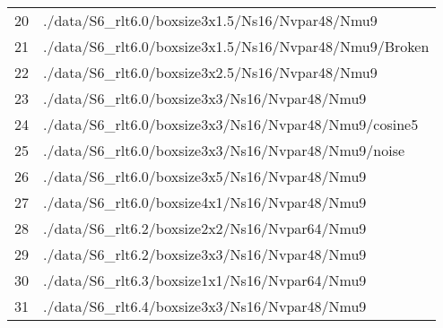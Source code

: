 \begin{center}
\begin{tabular}{l | l }
        20  & ./data/S6\_rlt6.0/boxsize3x1.5/Ns16/Nvpar48/Nmu9                  \\ 
        21  & ./data/S6\_rlt6.0/boxsize3x1.5/Ns16/Nvpar48/Nmu9/Broken           \\ 
        22  & ./data/S6\_rlt6.0/boxsize3x2.5/Ns16/Nvpar48/Nmu9                  \\ 
        23  & ./data/S6\_rlt6.0/boxsize3x3/Ns16/Nvpar48/Nmu9                    \\ 
        24  & ./data/S6\_rlt6.0/boxsize3x3/Ns16/Nvpar48/Nmu9/cosine5            \\
        25  & ./data/S6\_rlt6.0/boxsize3x3/Ns16/Nvpar48/Nmu9/noise              \\
        26  & ./data/S6\_rlt6.0/boxsize3x5/Ns16/Nvpar48/Nmu9                    \\ 
        27  & ./data/S6\_rlt6.0/boxsize4x1/Ns16/Nvpar48/Nmu9                    \\ 
        28  & ./data/S6\_rlt6.2/boxsize2x2/Ns16/Nvpar64/Nmu9                    \\ 
        29  & ./data/S6\_rlt6.2/boxsize3x3/Ns16/Nvpar48/Nmu9                    \\ 
        30  & ./data/S6\_rlt6.3/boxsize1x1/Ns16/Nvpar64/Nmu9                    \\ 
        31  & ./data/S6\_rlt6.4/boxsize3x3/Ns16/Nvpar48/Nmu9                    \\ 
    \end{tabular}
    \label{tab:parametersPath}
\end{center}